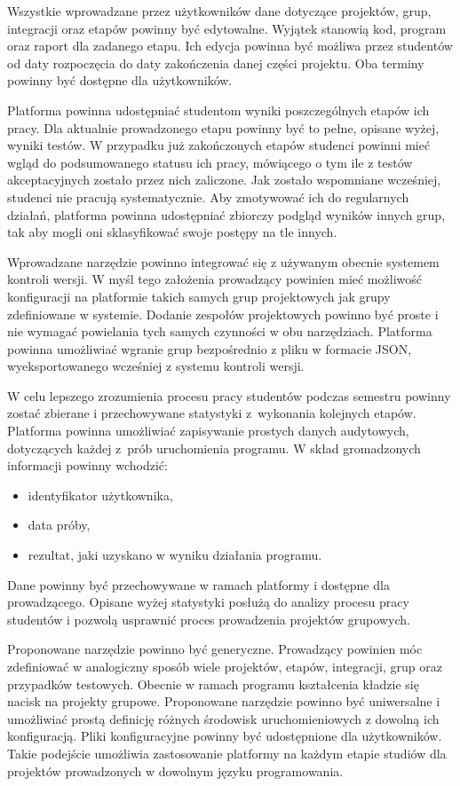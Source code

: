 Wszystkie wprowadzane przez użytkowników dane dotyczące projektów, grup, integracji oraz etapów powinny być edytowalne.
Wyjątek stanowią kod, program oraz raport dla zadanego etapu.
Ich edycja powinna być możliwa przez studentów od daty rozpoczęcia do daty zakończenia danej części projektu.
Oba terminy powinny być dostępne dla użytkowników.

Platforma powinna udostępniać studentom wyniki poszczególnych etapów ich pracy.
Dla aktualnie prowadzonego etapu powinny być to pełne, opisane wyżej, wyniki testów.
W przypadku już zakończonych etapów studenci powinni mieć wgląd do podsumowanego statusu ich pracy, mówiącego o tym ile z testów akceptacyjnych zostało przez nich zaliczone.
Jak zostało wspomniane wcześniej, studenci nie pracują systematycznie.
Aby zmotywować ich do regularnych działań, platforma powinna udostępniać zbiorczy podgląd wyników innych grup, tak aby mogli oni sklasyfikować swoje postępy na tle innych.

Wprowadzane narzędzie powinno integrować się z używanym obecnie systemem kontroli wersji.
W myśl tego założenia prowadzący powinien mieć możliwość konfiguracji na platformie takich samych grup projektowych jak grupy zdefiniowane w systemie.
Dodanie zespołów projektowych powinno być proste i nie wymagać powielania tych samych czynności w obu narzędziach.
Platforma powinna umożliwiać wgranie grup bezpośrednio z pliku w formacie JSON, wyeksportowanego wcześniej z systemu kontroli wersji.

W celu lepszego zrozumienia procesu pracy studentów podczas semestru powinny zostać zbierane i przechowywane statystyki z~wykonania kolejnych etapów.
Platforma powinna umożliwiać zapisywanie prostych danych audytowych, dotyczących każdej z~prób uruchomienia programu.
W skład gromadzonych informacji powinny wchodzić:
\begin{itemize}
    \item identyfikator użytkownika,
    \item data próby,
    \item rezultat, jaki uzyskano w wyniku działania programu.
\end{itemize}
Dane powinny być przechowywane w ramach platformy i dostępne dla prowadzącego.
Opisane wyżej statystyki posłużą do analizy procesu pracy studentów i pozwolą usprawnić proces prowadzenia projektów grupowych.

Proponowane narzędzie powinno być generyczne.
Prowadzący powinien móc zdefiniować w analogiczny sposób wiele projektów, etapów, integracji, grup oraz przypadków testowych.
Obecnie w ramach programu kształcenia kładzie się nacisk na projekty grupowe.
Proponowane narzędzie powinno być uniwersalne i umożliwiać prostą definicję różnych środowisk uruchomieniowych z dowolną ich konfiguracją.
Pliki konfiguracyjne powinny być udostępnione dla użytkowników.
Takie podejście umożliwia zastosowanie platformy na każdym etapie studiów dla projektów prowadzonych w dowolnym języku programowania.

